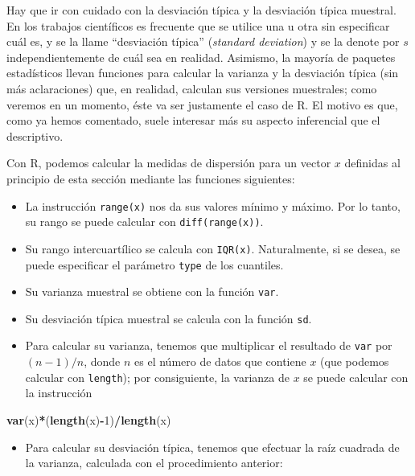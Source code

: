 \documentclass[]{book}
\newenvironment{Shaded}{\begin{snugshade}}{\end{snugshade}}
\newcommand{\DecValTok}[1]{\textcolor[rgb]{0.00,0.00,0.81}{#1}}
\newcommand{\KeywordTok}[1]{\textcolor[rgb]{0.13,0.29,0.53}{\textbf{#1}}}
\newcommand{\NormalTok}[1]{#1}
\newcommand{\OperatorTok}[1]{\textcolor[rgb]{0.81,0.36,0.00}{\textbf{#1}}}
\providecommand{\tightlist}{%
  \setlength{\itemsep}{0pt}\setlength{\parskip}{0pt}}
\theoremstyle{definition}
\theoremstyle{definition}
\theoremstyle{definition}
\theoremstyle{remark}
\begin{document}
Hay que ir con cuidado con la desviación típica y la desviación típica muestral. En los trabajos científicos es frecuente que se utilice una u otra sin especificar cuál es, y se la llame ``desviación típica'' (\emph{standard deviation}) y se la denote por \(s\) independientemente de cuál sea en realidad. Asimismo, la mayoría de paquetes estadísticos llevan funciones para calcular la varianza y la desviación típica (sin más aclaraciones) que, en realidad, calculan sus versiones muestrales; como veremos en un momento, éste va ser justamente el caso de R. El motivo es que, como ya hemos comentado, suele interesar más su aspecto inferencial que el descriptivo.

Con R, podemos calcular la medidas de dispersión para un vector \(x\) definidas al principio de esta sección mediante las funciones siguientes:

\begin{itemize}
\item
  La instrucción \texttt{range(x)} nos da sus valores mínimo y máximo. Por lo tanto, su rango se puede calcular con \texttt{diff(range(x))}.
\item
  Su rango intercuartílico se calcula con \texttt{IQR(x)}. Naturalmente, si se desea, se puede especificar el parámetro \texttt{type} de los cuantiles.
\item
  Su varianza muestral se obtiene con la función \texttt{var}.
\item
  Su desviación típica muestral se calcula con la función \texttt{sd}.
\item
  Para calcular su varianza, tenemos que multiplicar el resultado de \texttt{var} por \((n-1)/n\), donde \(n\) es el número de datos que contiene \(x\) (que podemos calcular con \texttt{length}); por consiguiente, la varianza de \(x\) se puede calcular con la instrucción
\end{itemize}

\begin{Shaded}
\begin{Highlighting}[]
\KeywordTok{var}\NormalTok{(x)}\OperatorTok{*}\NormalTok{(}\KeywordTok{length}\NormalTok{(x)}\OperatorTok{-}\DecValTok{1}\NormalTok{)}\OperatorTok{/}\KeywordTok{length}\NormalTok{(x)}
\end{Highlighting}
\end{Shaded}

\begin{itemize}
\tightlist
\item
  Para calcular su desviación típica, tenemos que efectuar la raíz cuadrada de la varianza, calculada con el procedimiento anterior:
\end{itemize}
\end{document}
